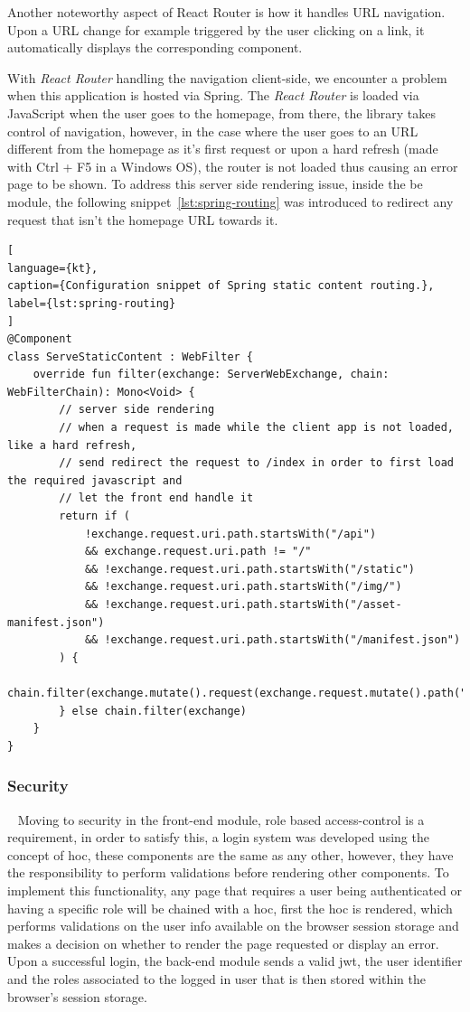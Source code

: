 Another noteworthy aspect of React Router is how it handles URL navigation. Upon a URL change for example triggered by the user clicking on a link, it automatically displays the corresponding component. 

With \textit{React Router} handling the navigation client-side, we encounter a problem when this application is hosted via Spring. The \textit{React Router} is loaded via JavaScript when the user goes to the homepage, from there, the library takes control of navigation, however, in the case where the user goes to an URL different from the homepage as it's first request or upon a hard refresh (made with Ctrl + F5 in a Windows OS), the router is not loaded thus causing an error page to be shown.
To address this server side rendering issue, inside the \acrshort{be} module, the following snippet~\ref{lst:spring-routing} was introduced to redirect any request that isn't the homepage URL towards it.

\begin{lstlisting}[
language={kt},
caption={Configuration snippet of Spring static content routing.},
label={lst:spring-routing}
]
@Component
class ServeStaticContent : WebFilter {
    override fun filter(exchange: ServerWebExchange, chain: WebFilterChain): Mono<Void> {
        // server side rendering
        // when a request is made while the client app is not loaded, like a hard refresh,
        // send redirect the request to /index in order to first load the required javascript and
        // let the front end handle it
        return if (
            !exchange.request.uri.path.startsWith("/api")
            && exchange.request.uri.path != "/"
            && !exchange.request.uri.path.startsWith("/static")
            && !exchange.request.uri.path.startsWith("/img/")
            && !exchange.request.uri.path.startsWith("/asset-manifest.json")
            && !exchange.request.uri.path.startsWith("/manifest.json")
        ) {
            chain.filter(exchange.mutate().request(exchange.request.mutate().path("/index.html").build()).build())
        } else chain.filter(exchange)
    }
}
\end{lstlisting}


\subsubsection{Security}~\label{ch:impl:sec:fe:subsec:auth}
Moving to security in the front-end module, role based access-control is a requirement, in order to satisfy this, a login system was developed using the concept of \acrfull{hoc}, these components are the same as any other, however, they have the responsibility to perform validations before rendering other components. To implement this functionality, any page that requires a user being authenticated or having a specific role will be chained with a \acrshort{hoc}, first the \acrshort{hoc} is rendered, which performs validations on the user info available on the browser session storage and makes a decision on whether to render the page requested or display an error.
Upon a successful login, the back-end module sends a valid \acrshort{jwt}, the user identifier and the roles associated to the logged in user that is then stored within the browser's session storage.


